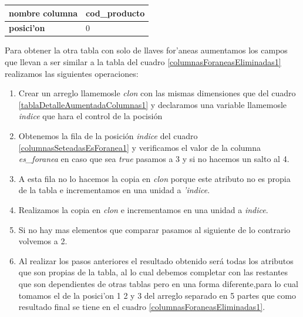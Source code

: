 
\begin{center}
  \label{columnasForaneasEliminadas1} %
  \begin{tabular}{|l|l|}
  \hline 
  \textbf{nombre columna} & cod\_producto \\ \hline
  \textbf{posici'on}      & 0             \\ \hline
  \end{tabular}
\end{center}
Para obtener la otra tabla con solo de llaves for'aneas aumentamos los campos que llevan a ser similar a la tabla del cuadro \ref{columnasForaneasEliminadas1} realizamos las siguientes operaciones:
 \begin{enumerate}
 \item Crear un arreglo llamemosle \textit{clon} con las mismas dimensiones que del cuadro \ref{tablaDetalleAumentadaColumnas1} y declaramos una variable llamemosle \textit{indice} que hara el control de la pocisi\'on  
 \item Obtenemos la fila de la posici\'on \textit{indice} del cuadro \ref{columnasSeteadasEsForanea1} y verificamos el valor de la columna \textit{es\_foranea} en caso que sea \textit{true} pasamos a 3 y si no hacemos un salto al 4.
 \item A esta fila no lo hacemos la copia en \textit{clon} porque este atributo no es propia de la tabla e incrementamos en una unidad a \textit{'indice}.
 \item Realizamos la copia en \textit{clon} e incrementamos en una unidad a \textit{indice}.
 \item Si no hay mas elementos que comparar pasamos al siguiente de lo contrario volvemos a 2.
 \item Al realizar los pasos anteriores el resultado obtenido ser\'a todas los atributos que son propias de la tabla, al lo cual debemos completar con las restantes que son dependientes de otras tablas pero en una forma diferente,para lo cual tomamos el de la posici'on 1 2 y 3 del arreglo separado en 5 partes que como resultado final se tiene en el cuadro \ref{columnasForaneasEliminadas1}.
 \end{enumerate}